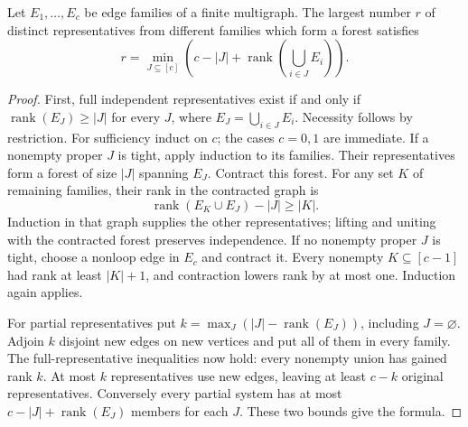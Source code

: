\begin{lemma}\label{lem:rainbow-forest-rank}
Let $E_1,\ldots,E_c$ be edge families of a finite multigraph. The largest
number $r$ of distinct representatives from different families which form a
forest satisfies
\[
 r=\min_{J\subseteq[c]}
 \left(c-|J|+\operatorname{rank}\left(\bigcup_{i\in J}E_i\right)\right).
\]
\end{lemma}
\begin{proof}
First, full independent representatives exist if and only if
$\operatorname{rank}(E_J)\ge|J|$ for every $J$, where
$E_J=\bigcup_{i\in J}E_i$. Necessity follows by restriction.
For sufficiency induct on $c$; the cases $c=0,1$ are immediate.
If a nonempty proper $J$ is tight, apply induction to its families.
Their representatives form a forest of size $|J|$ spanning $E_J$.
Contract this forest. For any set $K$ of remaining families, their rank in
the contracted graph is
\[
 \operatorname{rank}(E_K\cup E_J)-|J|\ge |K|.
\]
Induction in that graph supplies the other representatives; lifting and
uniting with the contracted forest preserves independence.
If no nonempty proper $J$ is tight, choose a nonloop edge in $E_c$ and
contract it. Every nonempty $K\subseteq[c-1]$ had rank at least $|K|+1$,
and contraction lowers rank by at most one. Induction again applies.

For partial representatives put
$k=\max_J(|J|-\operatorname{rank}(E_J))$, including $J=\varnothing$.
Adjoin $k$ disjoint new edges on new vertices and put all of them in every
family. The full-representative inequalities now hold: every nonempty union
has gained rank $k$. At most $k$ representatives use new edges, leaving at
least $c-k$ original representatives. Conversely every partial system has
at most $c-|J|+\operatorname{rank}(E_J)$ members for each $J$.
These two bounds give the formula.
\end{proof}

